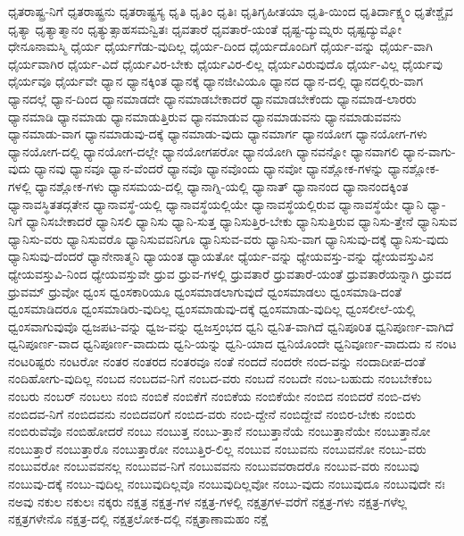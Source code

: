 {ಧೃತರಾಷ್ಟ್ರ-ನಿಗೆ
ಧೃತರಾಷ್ಟ್ರನು
ಧೃತರಾಷ್ಟ್ರಸ್ಯ
ಧೃತಿ
ಧೃತಿಂ
ಧೃತಿಃ
ಧೃತಿಗೃಹೀತಯಾ
ಧೃತಿ-ಯಿಂದ
ಧೃತಿರ್ದಾಕ್ಷ್ಯಂ
ಧೃತೇಶ್ಚೈವ
ಧೃತ್ಯಾ
ಧೃತ್ಯಾತ್ಮಾನಂ
ಧೃತ್ಯುತ್ಸಾಹಸಮನ್ವಿತಃ
ಧೃವತಾರೆ
ಧೃವತಾರೆ-ಯಂತೆ
ಧೃಷ್ಟ-ದ್ಯುಮ್ನರು
ಧೃಷ್ಟದ್ಯುಮ್ನೋ
ಧೇನೂನಾಮಸ್ಮಿ
ಧೈರ್ಯ
ಧೈರ್ಯಗೆಡು-ವುದಿಲ್ಲ
ಧೈರ್ಯ-ದಿಂದ
ಧೈರ್ಯದೊಂದಿಗೆ
ಧೈರ್ಯ-ವನ್ನು
ಧೈರ್ಯ-ವಾಗಿ
ಧೈರ್ಯವಾಗಿರ
ಧೈರ್ಯ-ವಿದೆ
ಧೈರ್ಯವಿರ-ಬೇಕು
ಧೈರ್ಯವಿರ-ಲಿಲ್ಲ
ಧೈರ್ಯವಿರುವುದೊ
ಧೈರ್ಯ-ವಿಲ್ಲ
ಧೈರ್ಯವು
ಧೈರ್ಯವೂ
ಧೈರ್ಯವೇ
ಧ್ಯಾನ
ಧ್ಯಾನಕ್ಕಿಂತ
ಧ್ಯಾನಕ್ಕೆ
ಧ್ಯಾನಜೀವಿಯೂ
ಧ್ಯಾನದ
ಧ್ಯಾನ-ದಲ್ಲಿ
ಧ್ಯಾನದಲ್ಲಿರು-ವಾಗ
ಧ್ಯಾನದಲ್ಲೆ
ಧ್ಯಾನ-ದಿಂದ
ಧ್ಯಾನಮಾಡದೇ
ಧ್ಯಾನಮಾಡಬೇಕಾದರೆ
ಧ್ಯಾನಮಾಡಬೇಕೆಂದು
ಧ್ಯಾನಮಾಡ-ಲಾರರು
ಧ್ಯಾನಮಾಡಿ
ಧ್ಯಾನಮಾಡು
ಧ್ಯಾನಮಾಡುತ್ತಿರುವ
ಧ್ಯಾನಮಾಡುವ
ಧ್ಯಾನಮಾಡುವನು
ಧ್ಯಾನಮಾಡುವವನು
ಧ್ಯಾನಮಾಡು-ವಾಗ
ಧ್ಯಾನಮಾಡುವು-ದಕ್ಕೆ
ಧ್ಯಾನಮಾಡು-ವುದು
ಧ್ಯಾನಮಾರ್ಗ
ಧ್ಯಾನಯೋಗ
ಧ್ಯಾನಯೋಗ-ಗಳು
ಧ್ಯಾನಯೋಗ-ದಲ್ಲಿ
ಧ್ಯಾನಯೋಗ-ದಲ್ಲೇ
ಧ್ಯಾನಯೋಗಪರೋ
ಧ್ಯಾನಯೋಗಿ
ಧ್ಯಾನವನ್ನೋ
ಧ್ಯಾನವಾಗಲಿ
ಧ್ಯಾನ-ವಾಗು-ವುದು
ಧ್ಯಾನವು
ಧ್ಯಾನವೂ
ಧ್ಯಾನ-ವೆಂದರೆ
ಧ್ಯಾನವೊ
ಧ್ಯಾನವೊಂದು
ಧ್ಯಾನವೋ
ಧ್ಯಾನಶ್ಲೋಕ-ಗಳನ್ನು
ಧ್ಯಾನಶ್ಲೋಕ-ಗಳಲ್ಲಿ
ಧ್ಯಾನಶ್ಲೋಕ-ಗಳು
ಧ್ಯಾನಸಮಯ-ದಲ್ಲಿ
ಧ್ಯಾನಾಗ್ನಿ-ಯಲ್ಲಿ
ಧ್ಯಾನಾತ್
ಧ್ಯಾನಾನಂದ
ಧ್ಯಾನಾನಂದಕ್ಕಿಂತ
ಧ್ಯಾನಾವಸ್ಥಿತತದ್ಗತೇನ
ಧ್ಯಾನಾವಸ್ಥೆ-ಯಲ್ಲಿ
ಧ್ಯಾನಾವಸ್ಥೆಯಲ್ಲಿಯೇ
ಧ್ಯಾನಾವಸ್ಥೆಯಲ್ಲಿರುವ
ಧ್ಯಾನಾವಸ್ಥೆಯೇ
ಧ್ಯಾನಿ
ಧ್ಯಾ-ನಿಗೆ
ಧ್ಯಾನಿಸಬೇಕಾದರೆ
ಧ್ಯಾನಿಸಲಿ
ಧ್ಯಾನಿಸು
ಧ್ಯಾನಿ-ಸುತ್ತ
ಧ್ಯಾನಿಸುತ್ತಿರ-ಬೇಕು
ಧ್ಯಾನಿಸುತ್ತಿರುವ
ಧ್ಯಾನಿಸು-ತ್ತೇನೆ
ಧ್ಯಾನಿಸುವ
ಧ್ಯಾನಿಸು-ವರು
ಧ್ಯಾನಿಸುವರೊ
ಧ್ಯಾನಿಸುವವನಿಗೂ
ಧ್ಯಾನಿಸುವ-ವರು
ಧ್ಯಾನಿಸು-ವಾಗ
ಧ್ಯಾನಿಸುವು-ದಕ್ಕೆ
ಧ್ಯಾನಿಸು-ವುದು
ಧ್ಯಾನಿಸುವು-ದೆಂದರೆ
ಧ್ಯಾನೇನಾತ್ಮನಿ
ಧ್ಯಾಯಂತ
ಧ್ಯಾಯತೋ
ಧ್ಯೆರ್ಯ-ವನ್ನು
ಧ್ಯೇಯವಸ್ತು-ವನ್ನು
ಧ್ಯೇಯವಸ್ತುವಿನ
ಧ್ಯೇಯವಸ್ತುವಿ-ನಿಂದ
ಧ್ಯೇಯವಸ್ತುವೇ
ಧ್ರುವ
ಧ್ರುವ-ಗಳಲ್ಲಿ
ಧ್ರುವತಾರೆ
ಧ್ರುವತಾರೆ-ಯಂತೆ
ಧ್ರುವತಾರೆಯನ್ನಾಗಿ
ಧ್ರುವದ
ಧ್ರುವಮ್
ಧ್ರುವೋ
ಧ್ವಂಸ
ಧ್ವಂಸಕಾರಿಯೂ
ಧ್ವಂಸಮಾಡಲಾಗುವುದೆ
ಧ್ವಂಸಮಾಡಲು
ಧ್ವಂಸಮಾಡಿ-ದಂತೆ
ಧ್ವಂಸಮಾಡಿದರೂ
ಧ್ವಂಸಮಾಡಿರು-ವುದಿಲ್ಲ
ಧ್ವಂಸಮಾಡುವು-ದಕ್ಕೆ
ಧ್ವಂಸಮಾಡು-ವುದಿಲ್ಲ
ಧ್ವಂಸಲೀಲೆ-ಯಲ್ಲಿ
ಧ್ವಂಸವಾಗುವುವೊ
ಧ್ವಜಪಟ-ವನ್ನು
ಧ್ವಜ-ವನ್ನು
ಧ್ವಜಸ್ತಂಭದ
ಧ್ವನಿ
ಧ್ವನಿತ-ವಾಗಿದೆ
ಧ್ವನಿಪೂರಿತ
ಧ್ವನಿಪೂರ್ಣ-ವಾಗಿದೆ
ಧ್ವನಿಪೂರ್ಣ-ವಾದ
ಧ್ವನಿಪೂರ್ಣ-ವಾದುದು
ಧ್ವನಿ-ಯನ್ನು
ಧ್ವನಿ-ಯಾದ
ಧ್ವನಿಯೊಂದೇ
ಧ್ವನಿವೂರ್ಣ-ವಾದುದು
ನ
ನಂಟ
ನಂಟರಿಷ್ಟರು
ನಂಟರೋ
ನಂತರ
ನಂತರದ
ನಂತರವೂ
ನಂತೆ
ನಂದದೆ
ನಂದರೇ
ನಂದ-ವನ್ನು
ನಂದಾದೀಪ-ದಂತೆ
ನಂದಿಹೋಗು-ವುದಿಲ್ಲ
ನಂಬದ
ನಂಬದವ-ನಿಗೆ
ನಂಬದ-ವರು
ನಂಬದೆ
ನಂಬದೇ
ನಂಬ-ಬಹುದು
ನಂಬಬೇಕೆಂಬ
ನಂಬರು
ನಂಬರ್
ನಂಬಲು
ನಂಬಿ
ನಂಬಿಕೆ
ನಂಬಿಕೆಗೆ
ನಂಬಿಕೆಯ
ನಂಬಿಕೆಯೇ
ನಂಬಿದ
ನಂಬಿದರೆ
ನಂಬಿ-ದಳು
ನಂಬಿದವ-ನಿಗೆ
ನಂಬಿದವನು
ನಂಬಿದವರಿಗೆ
ನಂಬಿದ-ವರು
ನಂಬಿ-ದ್ದೇನೆ
ನಂಬಿದ್ದೇವೆ
ನಂಬಿರ-ಬೇಕು
ನಂಬಿರು
ನಂಬಿರುವೆವೊ
ನಂಬಿಹೋದರೆ
ನಂಬು
ನಂಬುತ್ತ
ನಂಬು-ತ್ತಾನೆ
ನಂಬುತ್ತಾನೆಯೆ
ನಂಬುತ್ತಾನೆಯೇ
ನಂಬುತ್ತಾನೋ
ನಂಬುತ್ತಾರೆ
ನಂಬುತ್ತಾರೊ
ನಂಬುತ್ತಾರೋ
ನಂಬುತ್ತಿರ-ಲಿಲ್ಲ
ನಂಬುವ
ನಂಬುವನು
ನಂಬುವನೋ
ನಂಬು-ವರು
ನಂಬುವರೋ
ನಂಬುವವನಲ್ಲ
ನಂಬುವವ-ನಿಗೆ
ನಂಬುವವನು
ನಂಬುವವರಾದರೊ
ನಂಬುವ-ವರು
ನಂಬುವು
ನಂಬುವು-ದಕ್ಕೆ
ನಂಬು-ವುದಿಲ್ಲ
ನಂಬುವುದಿಲ್ಲವೊ
ನಂಬುವುದಿಲ್ಲವೋ
ನಂಬು-ವುದು
ನಂಬುವುದೂ
ನಂಬುವುದೇ
ನಃ
ನಅವು
ನಕುಲ
ನಕುಲಃ
ನಕ್ಕರು
ನಕ್ಷತ್ರ
ನಕ್ಷತ್ರ-ಗಳ
ನಕ್ಷತ್ರ-ಗಳಲ್ಲಿ
ನಕ್ಷತ್ರಗಳ-ವರೆಗೆ
ನಕ್ಷತ್ರ-ಗಳು
ನಕ್ಷತ್ರ-ಗಳೆಲ್ಲ
ನಕ್ಷತ್ರಗಳೇನೊ
ನಕ್ಷತ್ರ-ದಲ್ಲಿ
ನಕ್ಷತ್ರಲೋಕ-ದಲ್ಲಿ
ನಕ್ಷತ್ರಾಣಾಮಹಂ
ನಕ್ಷೆ
}
